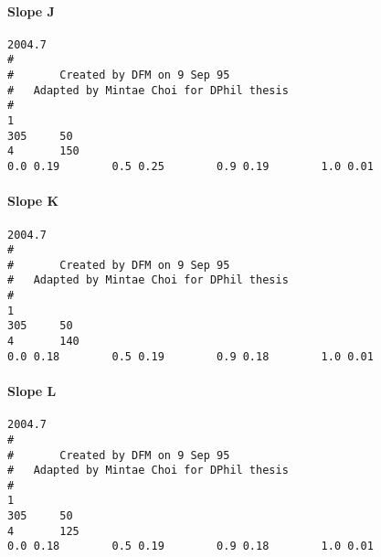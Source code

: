 \paragraph{Slope J}

\scriptsize

\begin{verbatim}
2004.7
#
#       Created by DFM on 9 Sep 95
#   Adapted by Mintae Choi for DPhil thesis
#
1
305     50
4       150
0.0 0.19		0.5 0.25		0.9 0.19		1.0 0.01
\end{verbatim}

\paragraph{Slope K}

\scriptsize

\begin{verbatim}
2004.7
#
#       Created by DFM on 9 Sep 95
#   Adapted by Mintae Choi for DPhil thesis
#
1
305     50
4       140
0.0 0.18		0.5 0.19		0.9 0.18		1.0 0.01
\end{verbatim}

\paragraph{Slope L}

\scriptsize

\begin{verbatim}
2004.7
#
#       Created by DFM on 9 Sep 95
#   Adapted by Mintae Choi for DPhil thesis
#
1
305     50
4       125
0.0 0.18		0.5 0.19		0.9 0.18		1.0 0.01
\end{verbatim}
